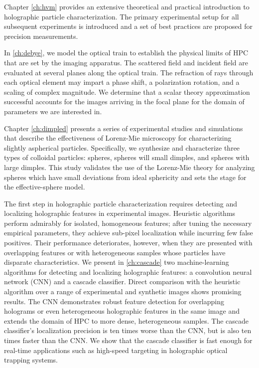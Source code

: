 Chapter \ref{ch:hvm} provides an extensive theoretical and practical
introduction to holographic particle characterization. The primary
experimental setup for all subsequent experiments is introduced and
a set of best practices are proposed for precision measurements. 

In \autoref{ch:debye}, we model the optical train to establish the
physical limits of HPC that are set by the imaging apparatus. The scattered
field and incident field are evaluated at several planes along the
optical train. The refraction of rays through each optical element
may impart a phase shift, a polarization rotation, and a scaling
of complex magnitude. We determine that a scalar theory
approximation successful accounts for the images arriving in the
focal plane for the domain of parameters we are interested in.

Chapter \ref{ch:dimpled} presents a series of experimental studies and
simulations that describe the effectiveness of Lorenz-Mie
microscopy for characterizing slightly aspherical particles.
Specifically, we synthesize and characterize three types of colloidal
particles: spheres, spheres will small dimples, and spheres with large dimples.
This study validates the use of the Lorenz-Mie theory
for analyzing spheres which have small deviations from
ideal sphericity and sets the stage for the effective-sphere model.

The first step in holographic particle characterization
requires detecting and localizing holographic features in experimental
images. Heuristic algorithms perform admirably for isolated, homogeneous
features; after tuning the necessary empirical parameters, they achieve
sub-pixel localization while incurring few false positives. Their
performance deteriorates, however, when they are presented with overlapping features or
with heterogeneous samples whose particles have disparate characteristics.
We present in \autoref{ch:cascade} two machine-learning algorithms for
detecting and localizing holographic features: a convolution
neural network (CNN) and a cascade classifier. Direct comparison with the
heuristic algorithm over a range of experimental and synthetic images
shows promising results. The CNN demonstrates robust feature detection
for overlapping holograms or even heterogeneous holographic features
in the same image and extends the domain of HPC to more dense, heterogeneous
samples. The cascade classifier's localization precision
is ten times worse than the CNN, but is also ten times faster than
the CNN. We show that the cascade classifier is fast enough for real-time
applications such as high-speed targeting in holographic optical
trapping systems.

